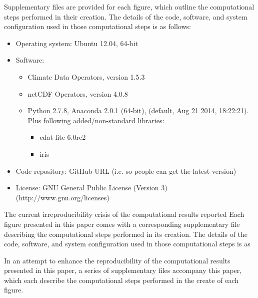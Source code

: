 Supplementary files are provided for each figure, which outline the computational steps performed in their creation. The details of the code, software, and system configuration used in those computational steps is as follows:   
\begin{itemize}
\item Operating system: Ubuntu 12.04, 64-bit %
\item Software: 
\begin{itemize}
\item Climate Data Operators, version 1.5.3 \citep{Schulzweida2014} %
\item netCDF Operators, version 4.0.8 \citep{Zender2014} %
\item Python 2.7.8, Anaconda 2.0.1 (64-bit), (default, Aug 21 2014, 18:22:21). Plus following added/non-standard libraries:  %
\begin{itemize}
\item cdat-lite 6.0rc2 %
\item iris \citep{Iris}
\end{itemize}
\end{itemize}
\item Code repository: GitHub URL (i.e. so people can get the latest version)
\item License: GNU General Public License (Version 3) (http://www.gnu.org/licenses) %
\end{itemize}



The current irreproducibility crisis  of the computational results reported 
Each figure presented in this paper comes with a corresponding supplementary file describing the computational steps performed in its creation. The details of the code, software, and system configuration used in those computational steps is as


In an attempt to enhance the reproducibility of the computational results presented in this paper, a series of supplementary files accompany this paper, which each describe the computational steps performed in the create of each figure.    